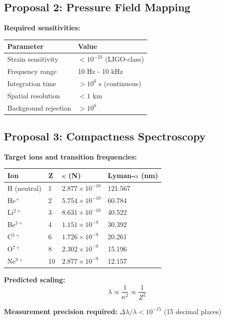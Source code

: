 \documentclass{article}
\begin{document}
\subsection{Proposal 2: Pressure Field Mapping}

\textbf{Required sensitivities:}

\begin{longtable}{ll}
\toprule
\textbf{Parameter} & \textbf{Value} \\
\midrule
Strain sensitivity & $< 10^{-23}$ (LIGO-class) \\
Frequency range & 10 Hz - 10 kHz \\
Integration time & $> 10^6$ s (continuous) \\
Spatial resolution & $< 1$ km \\
Background rejection & $> 10^6$ \\
\bottomrule
\end{longtable}

\subsection{Proposal 3: Compactness Spectroscopy}

\textbf{Target ions and transition frequencies:}

\begin{longtable}{llll}
\toprule
\textbf{Ion} & \textbf{Z} & \textbf{$\kappa$ (N)} & \textbf{Lyman-$\alpha$ (nm)} \\
\midrule
H (neutral) & 1 & $2.877 \times 10^{-10}$ & 121.567 \\
He$^+$ & 2 & $5.754 \times 10^{-10}$ & 60.784 \\
Li$^{2+}$ & 3 & $8.631 \times 10^{-10}$ & 40.522 \\
Be$^{3+}$ & 4 & $1.151 \times 10^{-9}$ & 30.392 \\
C$^{5+}$ & 6 & $1.726 \times 10^{-9}$ & 20.261 \\
O$^{7+}$ & 8 & $2.302 \times 10^{-9}$ & 15.196 \\
Ne$^{9+}$ & 10 & $2.877 \times 10^{-9}$ & 12.157 \\
\bottomrule
\end{longtable}

\textbf{Predicted scaling:}
\begin{equation}
\lambda \propto \frac{1}{\kappa^2} \propto \frac{1}{Z^2}
\end{equation}

\textbf{Measurement precision required:} $\Delta \lambda / \lambda < 10^{-15}$ (15 decimal places)
\end{document}
